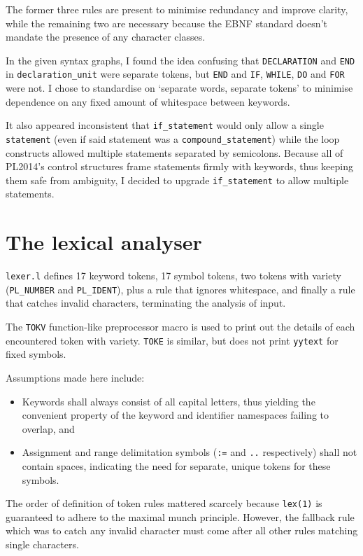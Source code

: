\documentclass[a4paper,titlepage,12pt]{article}
\begin{document}
The former three rules are present to minimise redundancy and improve
clarity, while the remaining two are necessary because the EBNF
standard doesn't mandate the presence of any character classes.

In the given syntax graphs, I found the idea confusing that
\texttt{DECLARATION} and \texttt{END} in \texttt{declaration\_unit}
were separate tokens, but \texttt{END} and \texttt{IF}, \texttt{WHILE},
\texttt{DO} and \texttt{FOR} were not. I chose to standardise on
`separate words, separate tokens' to minimise dependence on any fixed
amount of whitespace between keywords.

It also appeared inconsistent that \texttt{if\_statement} would only
allow a single \texttt{statement} (even if said statement was a
\texttt{compound\_statement}) while the loop constructs allowed
multiple statements separated by semicolons. Because all of PL2014's
control structures frame statements firmly with keywords, thus keeping
them safe from ambiguity, I decided to upgrade \texttt{if\_statement}
to allow multiple statements.

\section{The lexical analyser}

\texttt{lexer.l} defines 17 keyword tokens, 17 symbol tokens, two
tokens with variety (\texttt{PL\_NUMBER} and \texttt{PL\_IDENT}), plus
a rule that ignores whitespace, and finally a rule that catches invalid
characters, terminating the analysis of input.

The \texttt{TOKV} function-like preprocessor macro is used to print out
the details of each encountered token with variety. \texttt{TOKE} is
similar, but does not print \texttt{yytext} for fixed symbols.

Assumptions made here include:

\begin{itemize}
	\item Keywords shall always consist of all capital letters,
	      thus yielding the convenient property of the keyword
	      and identifier namespaces failing to overlap, and
	\item Assignment and range delimitation symbols (\texttt{:=}
	      and \texttt{..} respectively) shall not contain spaces,
	      indicating the need for separate, unique tokens for these
	      symbols.
\end{itemize}

The order of definition of token rules mattered scarcely because
\texttt{lex(1)} is guaranteed to adhere to the maximal munch principle.
However, the fallback rule which was to catch any invalid character
must come after all other rules matching single characters.
\end{document}
